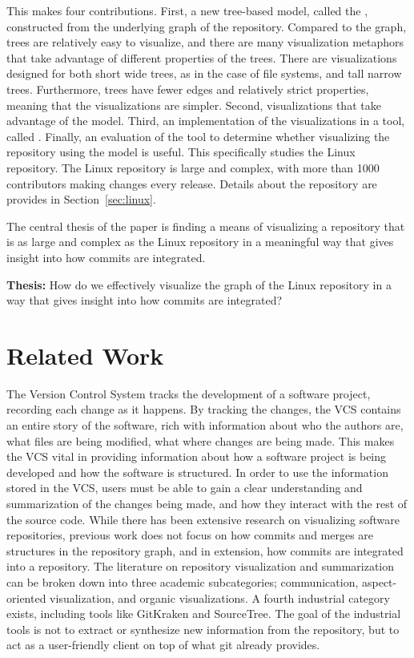 This \paper{} makes four contributions. First, a new tree-based model,
called the \mt{}, constructed from the underlying graph of the
repository. Compared to the graph, trees are relatively easy to
visualize, and there are many visualization metaphors that take
advantage of different properties of the trees. There are visualizations
designed for both short wide trees, as in the case of file systems, and
tall narrow trees. Furthermore, trees have fewer edges and relatively
strict properties, meaning that the visualizations are simpler. Second,
visualizations that take advantage of the \mt{} model. Third, an
implementation of the visualizations in a tool, called \tool{}. Finally,
an evaluation of the tool to determine whether visualizing the
repository using the model is useful. This \paper{} specifically studies
the Linux repository. The Linux repository is large and complex, with
more than 1000 contributors making changes every release. Details about
the repository are provides in Section~\ref{sec:linux}.

The central thesis of the paper is finding a means of visualizing a
repository that is as large and complex as the Linux repository in a
meaningful way that gives insight into how commits are integrated.

\begin{textbox}
  \textbf{Thesis:} How do we effectively visualize the graph of the
  Linux repository in a way that gives insight into how commits are
  integrated?
\end{textbox}

\section{Related Work}\label{sec:related_work}

The Version Control System tracks the development of a software project,
recording each change as it happens. By tracking the changes, the VCS
contains an entire story of the software, rich with information about
who the authors are, what files are being modified, what where changes
are being made. This makes the VCS vital in providing information about
how a software project is being developed and how the software is
structured. In order to use the information stored in the VCS, users
must be able to gain a clear understanding and summarization of the
changes being made, and how they interact with the rest of the source
code. While there has been extensive research on visualizing software
repositories, previous work does not focus on how commits and merges are
structures in the repository graph, and in extension, how commits are
integrated into a repository. The literature on repository visualization
and summarization can be broken down into three academic subcategories;
communication\cite{Cubranic2005,Begel2010}, aspect-oriented
visualization\cite{Ambros2005,Burch2005,Ambros2009}, and organic
visualizations\cite{ogawa09,Caudwell2010}. A fourth industrial category
exists, including tools like GitKraken and SourceTree. The goal of the
industrial tools is not to extract or synthesize new information from
the repository, but to act as a user-friendly client on top of what git
already provides.

